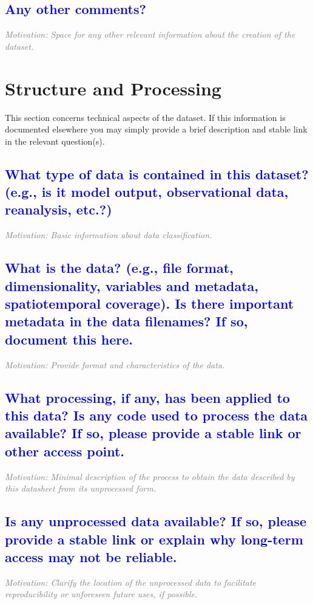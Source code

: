 \documentclass[letterpaper, 10 pt, transmag]{IEEEtran}
\begin{document}
\textcolor{blue}{\subsection{Any other comments?}}
\textcolor{gray}{\textit{Motivation: Space for any other relevant information about the creation of the dataset.}}  

\vspace{10mm}

\section{Structure and Processing}
This section concerns technical aspects of the dataset. If this information is documented elsewhere you may simply provide a brief description and stable link in the relevant question(s).

\textcolor{blue}{\subsection{What type of data is contained in this dataset? (e.g., is it model output, observational data, reanalysis, etc.?)}}
\textcolor{gray}{\textit{Motivation: Basic information about data classification.}}

\textcolor{blue}{\subsection{What is the data? (e.g., file format, dimensionality, variables and metadata, spatiotemporal coverage). Is there important metadata in the data filenames? If so, document this here.}}
\textcolor{gray}{\textit{Motivation: Provide format and characteristics of the data.}}

\textcolor{blue}{\subsection{What processing, if any, has been applied to this data? Is any code used to process the data available? If so, please provide a stable link or other access point.}}
\textcolor{gray}{\textit{Motivation: Minimal description of the process to obtain the data described by this datasheet from its unprocessed form.}}

\textcolor{blue}{\subsection{Is any unprocessed data available? If so, please provide a stable link or explain why long-term access may not be reliable.}}
\textcolor{gray}{\textit{Motivation: Clarify the location of the unprocessed data to facilitate reproducibility or unforeseen future uses, if possible.}}
\end{document}
